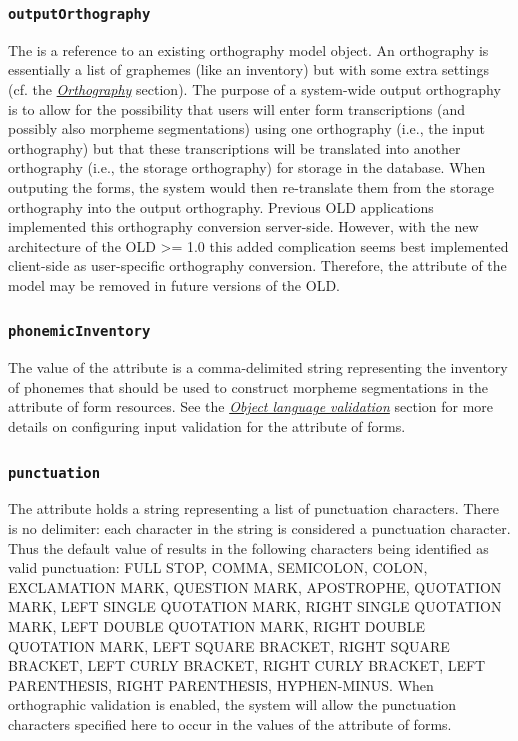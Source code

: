 \documentclass[letterpaper,10pt,english]{sphinxmanual}
\begin{document}
\subsubsection{\texttt{outputOrthography}}
\label{datastructure:outputorthography}
The  is a reference to an existing orthography model
object.  An orthography is essentially a list of graphemes (like an inventory)
but with some extra settings (cf. the {\hyperref[datastructure:orthography-data-structure]{\emph{Orthography}}}
section).  The purpose of a system-wide output orthography is to allow for the
possibility that users will enter form transcriptions (and possibly also
morpheme segmentations) using one orthography (i.e., the input orthography) but
that these transcriptions will be translated into another orthography (i.e., the
storage orthography) for storage in the database.  When outputing the forms, the
system would then re-translate them from the storage orthography into the output
orthography.  Previous OLD applications implemented this orthography conversion
server-side.  However, with the new architecture of the OLD \textgreater{}= 1.0 this added
complication seems best implemented client-side as user-specific orthography
conversion.  Therefore, the  attribute of the
 model may be removed in future versions of the OLD.


\subsubsection{\texttt{phonemicInventory}}
\label{datastructure:phonemicinventory}
The value of the  attribute is a comma-delimited string
representing the inventory of phonemes that should be used to construct morpheme
segmentations in the  attribute of form resources.  See the
{\hyperref[interface:object-language-validation]{\emph{Object language validation}}} section for more details on configuring input
validation for the  attribute of forms.


\subsubsection{\texttt{punctuation}}
\label{datastructure:punctuation}
The  attribute holds a string representing a list of punctuation
characters.  There is no delimiter: each character in the string is considered
a punctuation character.  Thus the default value of 
results in the following characters being identified as valid punctuation:
FULL STOP, COMMA, SEMICOLON, COLON, EXCLAMATION MARK, QUESTION MARK, APOSTROPHE,
QUOTATION MARK, LEFT SINGLE QUOTATION MARK, RIGHT SINGLE QUOTATION MARK,
LEFT DOUBLE QUOTATION MARK, RIGHT DOUBLE QUOTATION MARK, LEFT SQUARE BRACKET,
RIGHT SQUARE BRACKET, LEFT CURLY BRACKET, RIGHT CURLY BRACKET, LEFT PARENTHESIS,
RIGHT PARENTHESIS, HYPHEN-MINUS.  When orthographic validation is enabled, the
system will allow the punctuation characters specified here to occur in the
values of the  attribute of forms.
\end{document}
